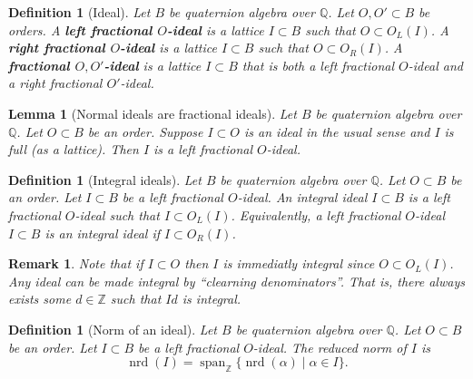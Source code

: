 \documentclass[10pt]{article}
\theoremstyle{plain}
\newtheorem{lemma}[theorem]{Lemma}
\newtheorem{remark}[theorem]{Remark}
\newtheorem{definition}[theorem]{Definition}
\theoremstyle{definition}
\newcommand{\op}{\operatorname}
\newcommand{\Z}{\mathbb{Z}}
\newcommand{\Q}{\mathbb{Q}}
\newcommand{\nrd}{\op{nrd}}
\begin{document}
\begin{definition}[Ideal]
    Let \( B \) be quaternion algebra over \( \Q \).
    Let \(O, O' \subset B\) be orders.
    A \textbf{left fractional $O$-ideal} is a lattice $I \subset B$ such that $O \subset O_L(I)$.
    A \textbf{right fractional $O$-ideal} is a lattice $I \subset B$ such that $O \subset O_R(I)$.
    A \textbf{fractional $O, O'$-ideal} is a lattice $I \subset B$ that is both a left fractional $O$-ideal and a right fractional $O'$-ideal.
\end{definition}

\begin{lemma}[Normal ideals are fractional ideals]
    Let \( B \) be quaternion algebra over \( \Q \).
    Let \(O \subset B\) be an order.
    Suppose \( I \subset O \) is an ideal in the usual sense and \( I \) is full (as a lattice).
    Then \( I \) is a left fractional \( O \)-ideal.
\end{lemma}

\begin{definition}[Integral ideals]
    Let \( B \) be quaternion algebra over \( \Q \).
    Let \(O \subset B\) be an order.
    Let \( I  \subset B \) be a left fractional \( O \)-ideal.
    An \emph{integral ideal} \( I  \subset B \) is a left fractional \( O \)-ideal such that \( I \subset O_L(I) \).
    Equivalently, a left fractional \( O \)-ideal \( I  \subset B \) is an integral ideal if \( I \subset O_R(I) \).
\end{definition}

\begin{remark}
    Note that if \( I \subset O \) then \( I \) is immediatly integral since \( O \subset O_L(I) \).
    Any ideal can be made integral by ``clearning denominators''.
    That is, there always exists some \( d \in \Z \) such that \( Id \) is integral.
\end{remark}

\begin{definition}[Norm of an ideal]
    Let \( B \) be quaternion algebra over \( \Q \).
    Let \(O \subset B\) be an order.
    Let \( I  \subset B \) be a left fractional \( O \)-ideal.
    The reduced norm of \( I \) is
    \[
        \nrd(I) = \op{span}_\Z\{ \nrd(\alpha) \mid \alpha \in I\}.
    \]
\end{definition}
\end{document}
